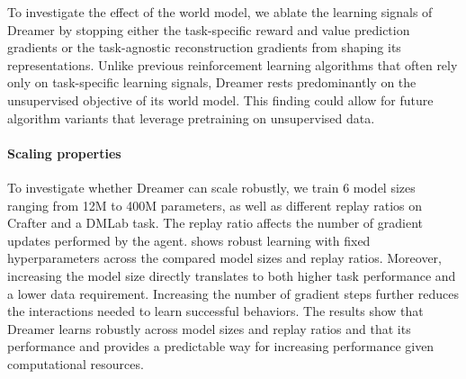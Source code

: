 To investigate the effect of the world model, we ablate the learning signals of Dreamer by stopping either the task-specific reward and value prediction gradients or the task-agnostic reconstruction gradients from shaping its representations. Unlike previous reinforcement learning algorithms that often rely only on task-specific learning signals\citep{mnih2015dqn,schrittwieser2019muzero}, Dreamer rests predominantly on the unsupervised objective of its world model. This finding could allow for future algorithm variants that leverage pretraining on unsupervised data.

\paragraph{Scaling properties}
To investigate whether Dreamer can scale robustly, we train 6 model sizes ranging from 12M to 400M parameters, as well as different replay ratios on Crafter \citep{hafner2021crafter} and a DMLab task\citep{beattie2016dmlab}. The replay ratio affects the number of gradient updates performed by the agent.
 shows robust learning with fixed hyperparameters across the compared model sizes and replay ratios.
Moreover, increasing the model size directly translates to both higher task performance and a lower data requirement.
Increasing the number of gradient steps further reduces the interactions needed to learn successful behaviors.
The results show that Dreamer learns robustly across model sizes and replay ratios and that its performance and provides a predictable way for increasing performance given computational resources.  %
